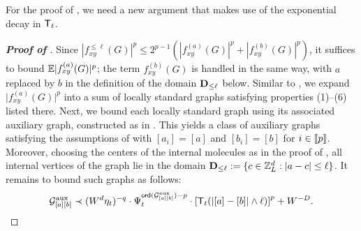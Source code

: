 For the proof of , we need a new argument that makes use of the exponential decay in ${\mathsf T}_t$. 
\begin{proof}[\bf Proof of ]
Since $|f_{xy}^{\le \ell}(G)|^p\le 2^{p-1}(|f_{xy}^{(a)}(G)|^p+|f_{xy}^{(b)}(G)|^p)$, it suffices to bound $\mathbb{E}|f_{xy}^{(a)}(G)|^{p}$; the term $f_{xy}^{(b)}(G)$ is handled in the same way, with $a$ replaced by $b$ in the definition of the domain ${\mathbf{D}}_{\le\ell}$ below.
Similar to , we expand $\big|f_{xy}^{(a)}(G)\big|^{p}$ into a sum of locally standard graphs satisfying properties (1)--(6) listed there.
Next, we bound each locally standard graph using its associated auxiliary graph, constructed as in . This yields a class of auxiliary graphs  satisfying the assumptions of  with $[a_i]=[a]$ and $[b_i]=[b]$ for $i\in \llbracket{p}\rrbracket$. Moreover, choosing the centers of the internal molecules as in the proof of , all internal vertices of the graph lie in the domain ${\mathbf{D}}_{\le \ell}:=\{c \in {\mathbb Z}_L^d:|a-c|\le \ell\}$. It remains to bound such graphs as follows: %
\begin{equation}\label{adsuu_exp}
\mathcal G^{\mathrm{aux}}_{[a][b]} \prec (W^d\eta_t)^{-q}\cdot \Psi_t^{{\mathsf{ord}}(\mathcal G^{\mathrm{aux}}_{[a][b]})-p}\cdot \left[{{\mathsf T}_{t}(|[a]-[b]|\wedge \ell)}\right]^{p}+W^{-D} .
\end{equation}


\end{proof}
